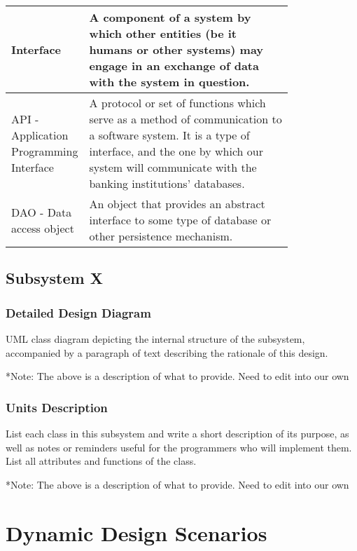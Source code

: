 \documentclass[12pt]{article}
\begin{document}
\begin{table}[H]
\begin{center}
{\begin{tabular}{|l|p{0.8\linewidth}|}
\hline
Interface & A component of a system by which other entities (be it humans or other systems) may engage in an exchange of data with the system in question. \\
\hline
API - Application Programming Interface & A protocol or set of functions which serve as a method of communication to a software system. It is a type of interface, and the one by which our system will communicate with the banking institutions' databases. \\
\hline
DAO - Data access object & An object that provides an abstract interface to some type of database or other persistence mechanism.\\
\hline

\end{tabular}}
\end{center}
\end{table}

\clearpage

\subsection{Subsystem X}

\subsubsection{Detailed Design Diagram}

UML class diagram depicting the internal structure of the subsystem,
accompanied by a paragraph of text describing the rationale of this design.

*Note: The above is a description of what to provide. Need to edit into our own




\subsubsection{Units Description}

List each class in this subsystem and write a short description of its purpose,
as well as notes or reminders useful for the programmers who will implement them.
List all attributes and functions of the class.

*Note: The above is a description of what to provide. Need to edit into our own

\section{Dynamic Design Scenarios} \label{Dynamic Models}
\end{document}
